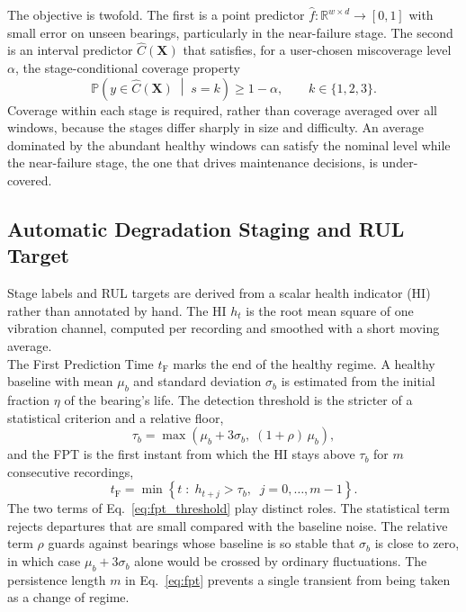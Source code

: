 The objective is twofold. The first is a point predictor
$\hat{f}: \mathbb{R}^{w \times d} \to [0,1]$ with small error on
unseen bearings, particularly in the near-failure stage. The second is
an interval predictor $\hat{C}(\mathbf{X})$ that satisfies, for a
user-chosen miscoverage level $\alpha$, the stage-conditional coverage
property
\begin{equation}
  \mathbb{P}\left( y \in \hat{C}(\mathbf{X}) \;\middle|\; s = k \right)
  \geq 1 - \alpha, \qquad k \in \{1, 2, 3\}.
  \label{eq:coverage_goal}
\end{equation}
Coverage within each stage is required, rather than coverage averaged
over all windows, because the stages differ sharply in size and
difficulty. An average dominated by the abundant healthy windows can
satisfy the nominal level while the near-failure stage, the one that
drives maintenance decisions, is under-covered.

\subsection{Automatic Degradation Staging and RUL Target}
\label{sec:method_staging}

Stage labels and RUL targets are derived from a scalar health
indicator (HI) rather than annotated by hand. The HI $h_t$ is the root
mean square of one vibration channel, computed per recording and
smoothed with a short moving average.\\

The First Prediction Time $t_{\mathrm{F}}$ marks the end of the healthy
regime. A healthy baseline with mean $\mu_b$ and standard deviation
$\sigma_b$ is estimated from the initial fraction $\eta$ of the
bearing's life. The detection threshold is the stricter of a
statistical criterion and a relative floor,
\begin{equation}
  \tau_b = \max\left( \mu_b + 3\sigma_b,\; (1+\rho)\,\mu_b \right),
  \label{eq:fpt_threshold}
\end{equation}
and the FPT is the first instant from which the HI stays above
$\tau_b$ for $m$ consecutive recordings,
\begin{equation}
  t_{\mathrm{F}} = \min \left\{ t \;:\; h_{t+j} > \tau_b,
  \;\; j = 0, \dots, m-1 \right\}.
  \label{eq:fpt}
\end{equation}
The two terms of Eq.~\eqref{eq:fpt_threshold} play distinct roles. The
statistical term rejects departures that are small compared with the
baseline noise. The relative term $\rho$ guards against bearings whose
baseline is so stable that $\sigma_b$ is close to zero, in which case
$\mu_b + 3\sigma_b$ alone would be crossed by ordinary fluctuations.
The persistence length $m$ in Eq.~\eqref{eq:fpt} prevents a single
transient from being taken as a change of regime.\\

